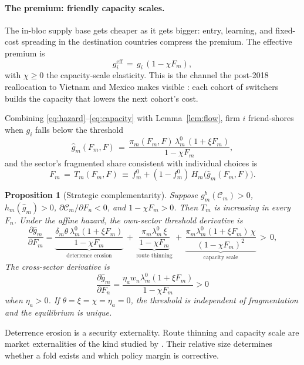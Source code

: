 \documentclass[11pt]{article}
\newtheorem{proposition}{Proposition}
\theoremstyle{definition}
\begin{document}
\paragraph{The premium: friendly capacity scales.} The in-bloc supply base gets cheaper as it gets bigger: entry, learning, and fixed-cost spreading in the destination countries compress the premium. The effective premium is
\begin{equation}
g_i^{\mathrm{eff}} \,=\, g_i\,(1 - \chi F_m),
\label{eq:capacity}
\end{equation}
with $\chi \ge 0$ the capacity-scale elasticity. This is the channel the post-2018 reallocation to Vietnam and Mexico makes visible \citep{AlfaroChor2023}: each cohort of switchers builds the capacity that lowers the next cohort's cost.

Combining \eqref{eq:hazard}--\eqref{eq:capacity} with Lemma~\ref{lem:flow}, firm $i$ friend-shores when $g_i$ falls below the threshold
\begin{equation}
\hat g_m(F_m, F) \,=\, \frac{\pi_m(F_m, F)\,\lambda_m^0\,(1 + \xi F_m)}{1 - \chi F_m},
\label{eq:threshold}
\end{equation}
and the sector's fragmented share consistent with individual choices is
\begin{equation}
F_m \,=\, T_m(F_m, F) \,\equiv\, f^0_m + (1 - f^0_m)\, H_m\!\big(\hat g_m(F_m, F)\big).
\label{eq:map}
\end{equation}

\begin{proposition}[Strategic complementarity]\label{prop:complementarity}
Suppose $g_m^b(\mathcal C_m)>0$, $h_m(\hat g_m)>0$, $\partial\mathcal C_m/\partial F_n<0$, and $1-\chi F_m>0$. Then $T_m$ is increasing in every $F_n$. Under the affine hazard, the own-sector threshold derivative is
\[
\frac{\partial \hat g_m}{\partial F_m}
= \underbrace{\frac{\delta_m \theta\, \lambda_m^0 (1+\xi F_m)}{1 - \chi F_m}}_{\text{deterrence erosion}}
\,+\, \underbrace{\frac{\pi_m \lambda_m^0\, \xi}{1 - \chi F_m}}_{\text{route thinning}}
\,+\, \underbrace{\frac{\pi_m \lambda_m^0 (1+\xi F_m)\,\chi}{(1 - \chi F_m)^2}}_{\text{capacity scale}} \,>\, 0,
\]
The cross-sector derivative is
\[
\frac{\partial\hat g_m}{\partial F_n}
=\frac{\eta_aw_n\lambda_m^0(1+\xi F_m)}{1-\chi F_m}>0
\]
when $\eta_a>0$. If $\theta=\xi=\chi=\eta_a=0$, the threshold is independent of fragmentation and the equilibrium is unique.
\end{proposition}

Deterrence erosion is a security externality. Route thinning and capacity scale are market externalities of the kind studied by \citet{CooperJohn1988}. Their relative size determines whether a fold exists and which policy margin is corrective.
\end{document}

